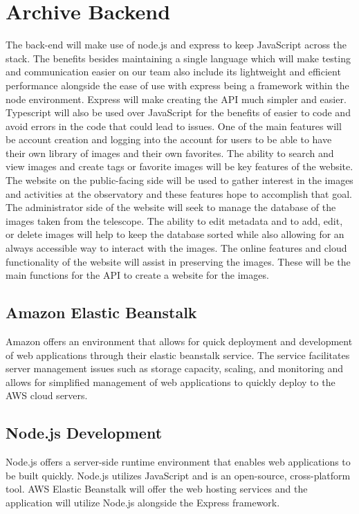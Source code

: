 \documentclass[12pt]{report}
\begin{document}
\section*{Archive Backend}

The back-end will make use of node.js and express to keep JavaScript across the stack.  The benefits besides maintaining a single language which will make testing and communication easier on our team also include its lightweight and efficient performance alongside the ease of use with express being a framework within the node environment.  Express will make creating the API much simpler and easier.  Typescript will also be used over JavaScript for the benefits of easier to code and avoid errors in the code that could lead to issues.
One of the main features will be account creation and logging into the account for users to be able to have their own library of images and their own favorites.  The ability to search and view images and create tags or favorite images will be key features of the website.  The website on the public-facing side will be used to gather interest in the images and activities at the observatory and these features hope to accomplish that goal.  
The administrator side of the website will seek to manage the database of the images taken from the telescope.  The ability to edit metadata and to add, edit, or delete images will help to keep the database sorted while also allowing for an always accessible way to interact with the images.  The online features and cloud functionality of the website will assist in preserving the images.  These will be the main functions for the API to create a website for the images.


\subsection{Amazon Elastic Beanstalk}

Amazon offers an environment that allows for quick deployment and development of web applications through their elastic beanstalk service.  The service facilitates server management issues such as storage capacity, scaling, and monitoring and allows for simplified management of web applications to quickly deploy to the AWS cloud servers.

\subsection{Node.js Development}

Node.js offers a server-side runtime environment that enables web applications to be built quickly.  Node.js utilizes JavaScript and is an open-source, cross-platform tool.  AWS Elastic Beanstalk will offer the web hosting services and the application will utilize Node.js alongside the Express framework.
\end{document}
